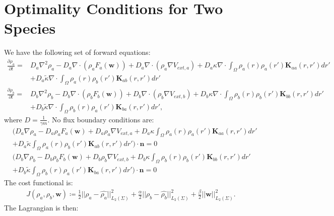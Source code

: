 \documentclass[11pt, a4paper]{article}
\theoremstyle{definition}
\newcommand{\ra}{\rho_a}
\newcommand{\rb}{\rho_b}
\newcommand{\w}{\mathbf{w}}
\newcommand{\n}{\mathbf{n}}
\newcommand{\K}{\mathbf{K}}
\begin{document}
\section*{Optimality Conditions for Two Species}
	We have the following set of forward equations:
	\begin{align*}
	\frac{\partial \ra}{\partial t} =& D_a\nabla^2 \ra - D_a\nabla \cdot(\ra F_a(\w)) + D_a \nabla \cdot (\ra \nabla V_{ext,a}) + D_a\kappa \nabla \cdot \int_\Omega \ra(r) \ra (r') \K_{aa}(r,r')dr' \\
	&+  D_a\tilde{\kappa}\nabla \cdot \int_\Omega \ra(r) \rb (r') \K_{ab}(r,r')dr'\\
	\frac{\partial \rb}{\partial t} =& D_b\nabla^2 \rb - D_b\nabla \cdot(\rb F_b(\w)) + D_b \nabla \cdot (\rb \nabla V_{ext,b}) + D_b\kappa \nabla \cdot \int_\Omega \rb(r) \rb (r') \K_{bb}(r,r')dr' \\
	&+  D_b\tilde{\kappa} \nabla \cdot \int_\Omega \rb(r) \ra (r') \K_{ba}(r,r')dr',
	\end{align*}
	where $D = \frac{1}{\gamma m}$.
	No flux boundary conditions are:
	\begin{align*}
	&\bigg( D_a \nabla \ra - D_a \ra F_a(\w) + D_a \ra \nabla V_{ext,a} + D_a\kappa \int_\Omega \ra(r) \ra (r') \K_{aa}(r,r')dr' \\
	&+  D_a\tilde{\kappa} \int_\Omega \ra(r) \rb (r') \K_{ab}(r,r')dr' \bigg) \cdot \n = 0\\
	&\bigg( D_b \nabla \rb - D_b \rb F_b(\w) + D_b \rb \nabla V_{ext,b} + D_b\kappa \int_\Omega \rb(r) \rb (r')\K_{bb}(r,r')dr' \\
	&+  D_b\tilde{\kappa} \int_\Omega \rb(r) \ra (r') \K_{ba}(r,r')dr' \bigg) \cdot \n = 0
	\end{align*}
	The cost functional is:
	\begin{align*}
	J(\ra,\rb, \w) \coloneqq \frac{1}{2}|| \ra - \widehat{\ra} ||^2_{L_2(\Sigma)} + \frac{\alpha}{2}|| \rb - \widehat {\rb} ||^2_{L_2(\Sigma)} + \frac{\beta}{2}||\w||^2_{L_2(\Sigma)}.
	\end{align*}
	The Lagrangian is then:
\end{document}
